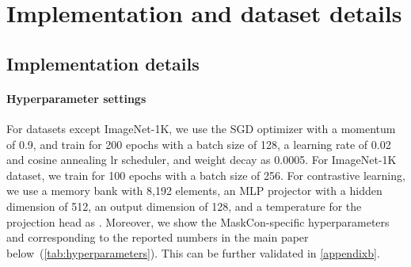 \documentclass[10pt,twocolumn,letterpaper]{article}
\begin{document}
\section{Implementation and dataset details}\label{appendixa}
\subsection{Implementation details}

\paragraph{Hyperparameter settings}
For datasets except ImageNet-1K, we use the SGD optimizer with a momentum of 0.9, and train for 200 epochs with a batch size of 128, a learning rate of 0.02 and cosine annealing lr scheduler, and weight decay as 0.0005. For ImageNet-1K dataset, we train for 100 epochs with a batch size of 256. For contrastive learning, we use a memory bank with 8,192 elements, an MLP projector with a hidden dimension of 512, an output dimension of 128, and a temperature for the projection head as . Moreover, we show the MaskCon-specific hyperparameters  and  corresponding to the reported numbers in the main paper below~(\cref{tab:hyperparameters}). This can be further validated in \cref{appendixb}.
\begin{table}[htbp]
\centering
{}
\caption{Hyperparameters in the main paper.}
\label{tab:hyperparameters}
\end{table}
\end{document}
